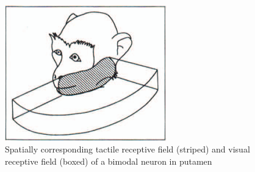 \begin{figure}
\centering    
\includegraphics[width=70mm]{Images/bimodal.png}
\caption{Spatially corresponding tactile receptive field (striped) and visual receptive field (boxed) of a bimodal neuron in putamen \citep{graziano1994mapping}}
\label{fig:bimodal}
\end{figure}